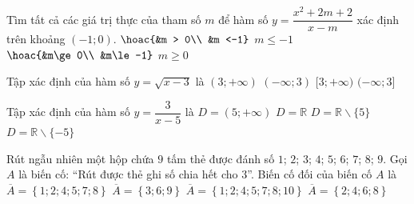\begin{ex}%
	Tìm tất cả các giá trị thực của tham số $m$ để hàm số $y=\dfrac{x^2+2m+2}{x-m}$ xác định  trên khoảng $(-1;0)$.
	\choice 
		{$\hoac{&m > 0\\ &m <-1}$} 
		{$m\le-1$} 
		{\True  $\hoac{&m\ge 0\\ &m\le-1}$}
		 {$m\ge 0$}
\end{ex}

\begin{ex}%
	Tập xác định của hàm số $y=\sqrt{x-3}$  là
	 \choice
		{$(3;+\infty)$} 
		 {$(-\infty;3)$}
		 {\True $[3;+\infty)$}
		 {$(-\infty;3]$}
	 \loigiai{
		Điều kiện xác định $x-3 \ge 0 \Leftrightarrow x \ge 3$. Vậy tập xác định là $\mathscr{D}=[3;+\infty)$. 
	} 
\end{ex}

\begin{ex}%
	Tập xác định  của hàm số $y=\dfrac{3}{x-5}$ là
	 \choice
		 {$D=(5;+\infty)$}
		 {$D= \mathbb{R}$}
		{\True  $D= \mathbb{R} \backslash\{5\}$}
		{$D= \mathbb{R}  \backslash\{-5\}$}
\end{ex}

\begin{ex}%
	Rút ngẫu nhiên một hộp chứa $9$ tấm thẻ được đánh số $1$; $2$; $3$; $4$; $5$; $6$; $7$; $8$; $9$. Gọi $A$ là biến cố: “Rút được thẻ  ghi số chia hết cho $3$”. Biến cố đối của biến cố $A$ là
	\choice 
		 {$\overline{A}=\left\{1;2;4;5;7;8\right\}$}
		 {$\overline{A}=\left\{3;6;9\right\}$}
		{\True  $\overline{A}=\left\{1;2;4;5;7;8;10\right\}$}
		 {$\overline{A}=\left\{2;4;6;8\right\}$}
\end{ex}

